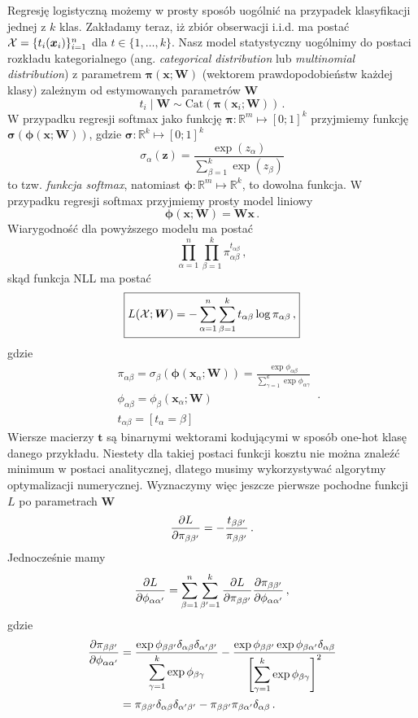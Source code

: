 \documentclass{myclass}
\begin{document}
Regresję logistyczną możemy w prosty sposób uogólnić na przypadek klasyfikacji jednej z \(k\) klas.
Zakładamy teraz, iż zbiór obserwacji i.i.d. ma postać \(\mathcal{X} = \{t_i(\bm{x}_i)\}_{i=1}^n\) dla \(t
\in \{1,\ldots,k\}\). Nasz model statystyczny uogólnimy do postaci rozkładu kategorialnego (ang.
\emph{categorical distribution} lub \emph{multinomial distribution}) z parametrem \(\bm{\pi}(\bm{x};
\bm{W})\) (wektorem prawdopodobieństw każdej klasy) zależnym od estymowanych parametrów \(\bm{W}\)
\[
t_i \mid \bm{W} \sim \mathrm{Cat}(\bm{\pi}(\bm{x}_i; \bm{W}))\,.
\]
W przypadku regresji softmax jako funkcję \(\bm{\pi}: \mathbb{R}^m \mapsto [0;1]^k\) przyjmiemy
funkcję \(\bm{\sigma}(\bm{\phi}(\bm{x}; \bm{W}))\), gdzie \(\bm{\sigma}: \mathbb{R}^k \mapsto
[0;1]^k\)
\[
\sigma_\alpha(\bm{z}) = \frac{\exp(z_\alpha)}{ \sum_{\beta=1}^k \exp(z_\beta)}
\]
to tzw. \emph{funkcja softmax}, natomiast \(\bm{\phi}: \mathbb{R}^m \mapsto \mathbb{R}^k\), to
dowolna funkcja. W przypadku regresji softmax przyjmiemy prosty model liniowy
\[
\bm{\phi}(\bm{x}; \bm{W}) = \bm{W}\bm{x}\,.
\]
Wiarygodność dla powyższego modelu ma postać
\[
\prod_{\alpha=1}^n \prod_{\beta=1}^k \pi_{\alpha\beta}^{t_{\alpha\beta}}\,,
\]
skąd funkcja NLL ma postać
\[
\boxed{
L(\mathcal{X}; \bm{W}) = - \sum_{\alpha=1}^n \sum_{\beta=1}^k t_{\alpha\beta} \log \pi_{\alpha\beta}\,,
}
\]
gdzie
\[
\begin{split}
    &\pi_{\alpha\beta} = \sigma_\beta(\bm{\phi}(\bm{x}_\alpha; \bm{W})) = \frac{\exp \phi_{\alpha\beta}}{\displaystyle \sum_{\gamma=1}^k \exp \phi_{\alpha\gamma}}\\
    &\phi_{\alpha\beta} = \phi_{\beta}(\bm{x}_\alpha; \bm{W}) \\
    &t_{\alpha\beta} = [t_\alpha = \beta]
\end{split}\,.
\]
Wiersze macierzy \(\bm{t}\) są binarnymi wektorami kodującymi w sposób one-hot klasę danego
przykładu. Niestety dla takiej postaci funkcji kosztu nie można znaleźć minimum w postaci
analitycznej, dlatego musimy wykorzystywać algorytmy optymalizacji numerycznej. Wyznaczymy więc
jeszcze pierwsze pochodne funkcji \(L\) po parametrach \(\bm{W}\)
\[
    \pdv{L}{\pi_{\beta\beta'}} = - \frac{t_{\beta\beta'}}{\pi_{\beta\beta'}}\,.
\]
Jednocześnie mamy
\[
    \pdv{L}{\phi_{\alpha\alpha'}} = \sum_{\beta=1}^n \sum_{\beta'=1}^k \pdv{L}{\pi_{\beta\beta'}} \pdv{\pi_{\beta\beta'}}{\phi_{\alpha\alpha'}}\,,
\]
gdzie
\[
\begin{split}
    \pdv{\pi_{\beta\beta'}}{\phi_{\alpha\alpha'}} &= \frac{\exp \phi_{\beta\beta'} \delta_{\alpha\beta} \delta_{\alpha'\beta'} }{ \displaystyle \sum_{\gamma=1}^k \exp \phi_{\beta\gamma}} - \frac{\exp \phi_{\beta\beta'} \exp \phi_{\beta\alpha'} \delta_{\alpha\beta}}{\displaystyle \left[ \sum_{\gamma=1}^k \exp \phi_{\beta\gamma} \right]^2} \\
           &= \pi_{\beta\beta'} \delta_{\alpha\beta} \delta_{\alpha'\beta'} - \pi_{\beta\beta'} \pi_{\beta\alpha'} \delta_{\alpha\beta}\,.
\end{split}
\]
\end{document}
